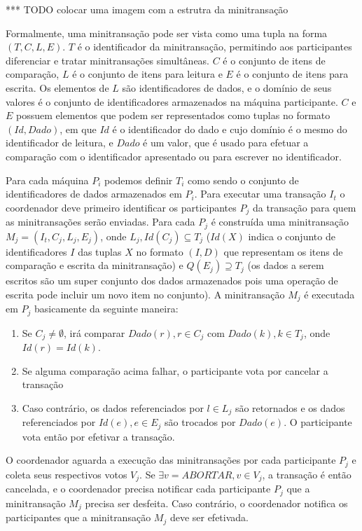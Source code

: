 \documentclass[11pt,twoside,a4paper]{book}
\begin{document}
*** TODO colocar uma imagem com a estrutra da minitransação

Formalmente, uma minitransação pode ser vista como uma tupla na forma \( (T, C, L, E) \). \(T\) é o identificador da minitransação, permitindo aos participantes diferenciar e tratar minitransações simultâneas. \(C\) é o conjunto de itens de comparação, \(L\) é o conjunto de itens para leitura e \(E\) é o conjunto de itens para escrita. Os elementos de \(L\) são identificadores de dados, e o domínio de seus valores é o conjunto de identificadores armazenados na máquina participante. \(C\) e \(E\) possuem elementos que podem ser representados como tuplas no formato \((Id, Dado)\), em que \(Id\) é o identificador do dado e cujo domínio é o mesmo do identificador de leitura, e \(Dado\) é um valor, que é usado para efetuar a comparação com o identificador apresentado ou para escrever no identificador.

Para cada máquina \(P_i\) podemos definir \(T_i\) como sendo o conjunto de identificadores de dados armazenados em \(P_i\). Para executar uma transação \(I_t\) o coordenador deve primeiro identificar os participantes \(P_j\) da transação para quem as minitransações serão enviadas. Para cada \(P_j\) é construída uma minitransação \(M_j = (I_t, C_j, L_j, E_j)\), onde \(L_j, Id(C_j) \subseteq T_j\) (\(Id(X)\) indica o conjunto de identificadores \(I\) das tuplas \(X\) no formato \((I,D)\) que representam os itens de comparação e escrita da minitransação) e \(Q(E_j) \supseteq T_j \) (os dados a serem escritos são um super conjunto dos dados armazenados pois uma operação de escrita pode incluir um novo item no conjunto). A minitransação \(M_j\) é executada em \(P_j\) basicamente da seguinte maneira:

\begin{enumerate}
\item Se \(C_j \neq \emptyset\), irá comparar \(Dado(r), r \in C_j\) com \(Dado(k), k \in T_j\), onde \(Id(r) = Id(k)\).
\item Se alguma comparação acima falhar, o participante vota por cancelar a transação
\item Caso contrário, os dados referenciados por \(l \in L_j\) são retornados e os dados referenciados por \(Id(e), e \in E_j\) são trocados por \(Dado(e)\). O participante vota então por efetivar a transação.
\end{enumerate}

O coordenador aguarda a execução das minitransações por cada participante \(P_j\) e coleta seus respectivos votos \(V_j\). Se \(\exists v=ABORTAR, v \in V_j\), a transação é então cancelada, e o coordenador precisa notificar cada participante \(P_j\) que a minitransação \(M_j\) precisa ser desfeita. Caso contrário, o coordenador notifica os participantes que a minitransação \(M_j\) deve ser efetivada.
\end{document}
